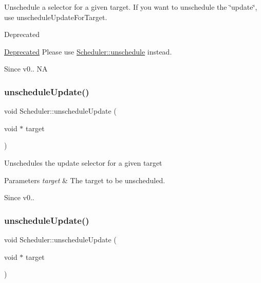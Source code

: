 Unschedule a selector for a given target. If you want to unschedule the \char`\"{}update\char`\"{}, use unschedule\+Update\+For\+Target. \begin{DoxyRefDesc}{Deprecated}
\item[\hyperlink{deprecated__deprecated000292}{Deprecated}]Please use \textquotesingle{}\hyperlink{classScheduler_a3ca194b9ca146d9c522cc2c54a6d4ede}{Scheduler\+::unschedule}\textquotesingle{} instead. \end{DoxyRefDesc}
\begin{DoxySince}{Since}
v0..  NA 
\end{DoxySince}
\mbox{\label{classScheduler_acc7bc87cc441a0f826c2a6758a9adcad}} 
\subsubsection{\texorpdfstring{unschedule\+Update()}{unscheduleUpdate()}\hspace{0.1cm}{\footnotesize\ttfamily [1/2]}}
{\footnotesize\ttfamily void Scheduler\+::unschedule\+Update (\begin{DoxyParamCaption}\item[{void $\ast$}]{target }\end{DoxyParamCaption})}

Unschedules the update selector for a given target 
\begin{DoxyParams}{Parameters}
{\em target} & The target to be unscheduled. \\
\hline
\end{DoxyParams}
\begin{DoxySince}{Since}
v0.. 
\end{DoxySince}
\mbox{\label{classScheduler_acc7bc87cc441a0f826c2a6758a9adcad}} 
\subsubsection{\texorpdfstring{unschedule\+Update()}{unscheduleUpdate()}\hspace{0.1cm}{\footnotesize\ttfamily [2/2]}}
{\footnotesize\ttfamily void Scheduler\+::unschedule\+Update (\begin{DoxyParamCaption}\item[{void $\ast$}]{target }\end{DoxyParamCaption})}

